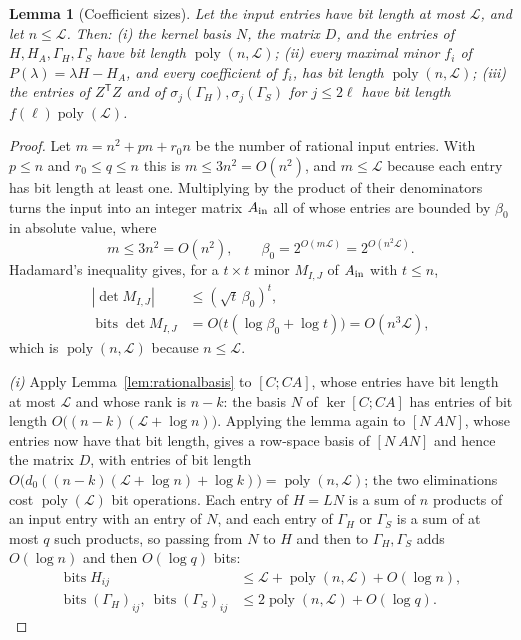 \documentclass[journal]{IEEEtran}
\theoremstyle{plainn}
\newtheorem{lem}[thm]{Lemma}
\theoremstyle{remark}
\begin{document}
\begin{lem}[Coefficient sizes]\label{lem:coeff}
Let the input entries have bit length at most $\mathcal L$, and let
$n\le\mathcal L$. Then:
\emph{(i)} the kernel basis $N$, the matrix $D$, and the entries of
$H,H_A,\Gamma_H,\Gamma_S$ have bit length $\operatorname{poly}(n,\mathcal L)$;
\emph{(ii)} every maximal minor $f_i$ of $P(\lambda)=\lambda H-H_A$, and every
coefficient of $f_i$, has bit length $\operatorname{poly}(n,\mathcal L)$;
\emph{(iii)} the entries of $Z^{\mathsf T}Z$ and of $\sigma_j(\Gamma_H),\sigma_j(\Gamma_S)$ for
$j\le2\ell$ have bit length $f(\ell)\operatorname{poly}(\mathcal L)$.
\end{lem}

\begin{proof}
Let $m=n^2+pn+r_0n$ be the number of rational input entries. With $p\le n$ and $r_0\le q\le n$ this
is $m\le3n^2=O(n^2)$, and $m\le\mathcal L$ because each entry has bit length at least one. Multiplying
by the product of their denominators turns the input into an integer matrix $A_{\rm in}$ all of whose
entries are bounded by $\beta_0$ in absolute value, where
\begin{equation*}
m\le3n^2=O(n^2),\qquad \beta_0=2^{O(m\mathcal L)}=2^{O(n^2\mathcal L)} .
\end{equation*}
Hadamard's inequality gives, for a $t\times t$ minor $M_{I,J}$ of $A_{\rm in}$
with $t\le n$,
\begin{equation*}
\begin{aligned}
|\det M_{I,J}|&\le(\sqrt t\,\beta_0)^t,\\
\operatorname{bits}\det M_{I,J}
&=O\bigl(t(\log\beta_0+\log t)\bigr)=O(n^3\mathcal L),
\end{aligned}
\end{equation*}
which is $\operatorname{poly}(n,\mathcal L)$ because $n\le\mathcal L$.

\emph{(i)} Apply Lemma~\ref{lem:rationalbasis} to $[C;CA]$, whose entries have bit length at most
$\mathcal L$ and whose rank is $n-k$: the basis $N$ of $\ker[C;CA]$ has entries of bit length
$O\bigl((n-k)(\mathcal L+\log n)\bigr)$. Applying the lemma again to $[N\ AN]$, whose entries now
have that bit length, gives a row-space basis of $[N\ AN]$ and hence the matrix $D$, with entries of
bit length $O\bigl(d_0((n-k)(\mathcal L+\log n)+\log k)\bigr)=\operatorname{poly}(n,\mathcal L)$;
the two eliminations cost $\operatorname{poly}(\mathcal L)$ bit operations.
Each entry of $H=LN$ is a sum of $n$ products of an input entry with an entry of
$N$, and each entry of $\Gamma_H$ or $\Gamma_S$ is a sum of at most $q$ such products, so
passing from $N$ to $H$ and then to $\Gamma_H,\Gamma_S$ adds $O(\log n)$ and then
$O(\log q)$ bits:
\begin{equation*}
\begin{aligned}
\operatorname{bits}H_{ij}&\le\mathcal L+\operatorname{poly}(n,\mathcal L)+O(\log n),\\
\operatorname{bits}(\Gamma_H)_{ij},\ \operatorname{bits}(\Gamma_S)_{ij}
&\le2\operatorname{poly}(n,\mathcal L)+O(\log q).
\end{aligned}
\end{equation*}


\end{proof}
\end{document}
